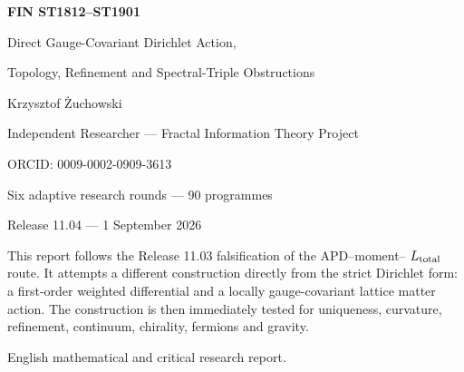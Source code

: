 \documentclass[11pt,a4paper]{article}
\begin{document}
\begin{titlepage}\centering\vspace*{14mm}
{\Huge\bfseries FIN ST1812--ST1901\par}\vspace{4mm}
{\LARGE Direct Gauge-Covariant Dirichlet Action,\par}\vspace{2mm}
{\LARGE Topology, Refinement and Spectral-Triple Obstructions\par}\vspace{12mm}
{\Large Krzysztof \.Zuchowski\par}
{\normalsize Independent Researcher --- Fractal Information Theory Project\par}
{\normalsize ORCID: 0009-0002-0909-3613\par}\vspace{9mm}
{\large Six adaptive research rounds --- 90 programmes\par}
{\large Release 11.04 --- 1 September 2026\par}
\vfill
\begin{minipage}{.87\textwidth}\small
This report follows the Release 11.03 falsification of the APD--moment--
$L_{\rm total}$ route.  It attempts a different construction directly from the
strict Dirichlet form: a first-order weighted differential and a locally
gauge-covariant lattice matter action.  The construction is then immediately
tested for uniqueness, curvature, refinement, continuum, chirality, fermions
and gravity.
\end{minipage}\vfill
{\small English mathematical and critical research report.}
\end{titlepage}
\end{document}
